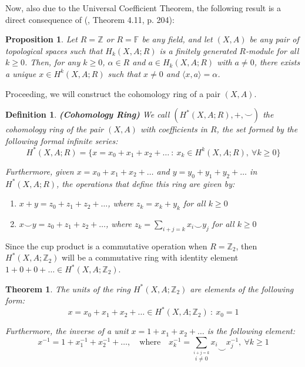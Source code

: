 \documentclass[12pt,oneside]{book}
\newtheorem{defi}   {Definition}[chapter]
\newtheorem{teo}    {Theorem}[chapter]
\newtheorem{prop}   {Proposition}[chapter]
\newcommand{\ds}{\displaystyle}
\newcommand{\Z}{\mathbb{Z}}
\newcommand{\ccup}{\smile}
\begin{document}
    Now, also due to the Universal Coefficient Theorem, the 
    following result is a direct consequence of (\cite{hungerford}, Theorem 4.11, p. 204):
    
    \begin{prop}\label{prop_alg_comut}
        Let $R=\mathbb{Z}$ or $R=\mathbb{F}$ be any field, and let $(X,A)$ be any pair of topological 
        spaces such that $H_{k}(X,A;R)$ is a finitely generated 
        $R$-module for all $k\geq 0$. Then, for any $k\geq 0$, 
        $\alpha\in R$ and $a\in H_{k}(X,A;R)$ with $a\neq 0$, there exists a unique $x\in H^{k}(X,A;R)$ 
        such that $x\neq 0$ and $\langle x, a \rangle = \alpha$.
    \end{prop}
    
    Proceeding, we will construct the cohomology ring of a pair $(X,A)$.
    
    \begin{defi}{\bf (Cohomology Ring)}
        We call $(H^{*}(X,A;R), +, \ccup)$ the cohomology ring of the pair 
        $(X,A)$ with coefficients in $R$, the set formed by the following formal infinite series:
        $$
        H^{*}(X,A;R) = \{ x = x_{0} + x_{1} + x_{2} + \ldots \ : \ x_{k}\in H^{k}(X,A;R), \ \forall 
        k\geq 0 \}
        $$
        
        Furthermore, given $x = x_{0} + x_{1} + x_{2} + \ldots$ and $y = y_{0} + y_{1} + y_{2} + \ldots$ 
        in $H^{*}(X,A;R)$, the operations that define this ring are given by:
        
        \begin{enumerate}
            \item $x + y = z_{0} + z_{1} + z_{2} + \ldots$, where $z_{k} = x_{k} + y_{k}$ for all 
            $k\geq 0$
            \item $x\ccup y = z_{0} + z_{1} + z_{2} + \ldots$, where $z_{k} = 
            \displaystyle\sum_{i+j=k} x_{i}\ccup y_{j}$ for all $k\geq 0$
        \end{enumerate}
    \end{defi}

    Since the cup product is a commutative operation when $R=\Z_{2}$, then $H^{*}(X,A;\Z_{2})$ will be a commutative ring with identity 
    element $1+0+0+\dots\in H^{*}(X,A;\Z_{2})$.

    \begin{teo}\label{teo_elemento_inversivel}
        The units of the ring $H^{*}(X,A;\Z_{2})$ are elements of the following form:
        $$ x=x_{0}+x_{1}+x_{2}+\dots\in H^{*}(X,A;\Z_{2}) \ : \ x_{0}=1 $$
        
        Furthermore, the inverse of a unit $x=1+x_{1}+x_{2}+\dots$ is the following element:
        $$ x^{-1}=1+x^{-1}_{1}+x^{-1}_{2}+\dots, \quad \text{where} \quad x^{-1}_{k}=\ds\sum_{\stackrel{i+j=k}{i\neq 0}}x_{i}\ccup 
        x^{-1}_{j}, \ \forall k\geq 1 $$
    \end{teo}
    
\end{document}
